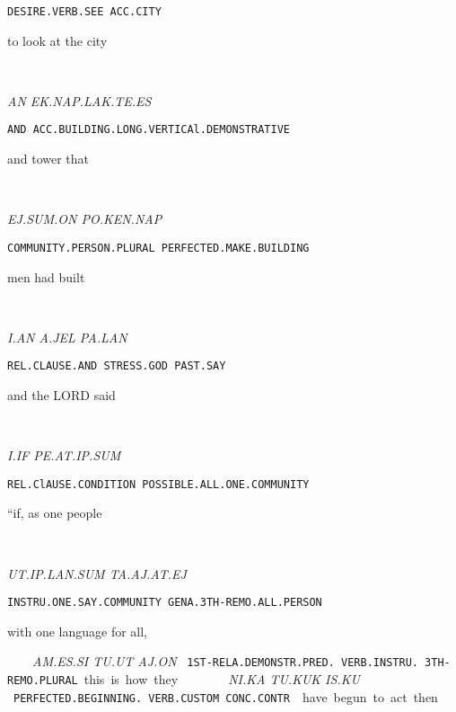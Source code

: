 {{\tt DESIRE.VERB.SEE	ACC.CITY }

to look			at the city 

\drie 
  
\an~\ek\nap\lak\te\es

{\it AN	EK.NAP.LAK.TE.ES			 }

{\tt AND	ACC.BUILDING.LONG.VERTICAl.DEMONSTRATIVE	 }

and 	tower 				that 			 

\drie 

\ej\Atlansum\on ~ \po\ken\nap

{\it EJ.SUM.ON			PO.KEN.NAP }

{\tt COMMUNITY.PERSON.PLURAL	PERFECTED.MAKE.BUILDING }

men				had built 

  
\drie 

\Atlani\an ~ \Atlana\jel~\pa\lan

{\it I.AN			A.JEL		PA.LAN }

{\tt REL.CLAUSE.AND              STRESS.GOD	PAST.SAY }

and 			the LORD            said 

\drie 

\Atlani\Atlanif~\pe\at\ip\Atlansum

{\it I.IF			PE.AT.IP.SUM				 }

{\tt REL.ClAUSE.CONDITION	POSSIBLE.ALL.ONE.COMMUNITY		 }

“if, 			as one people 		
\drie 


\ut\ip\lan\Atlansum~\ta\aj\at\ej\comma

{\it UT.IP.LAN.SUM			TA.AJ.AT.EJ }

{\tt INSTRU.ONE.SAY.COMMUNITY	GENA.3TH-REMO.ALL.PERSON	 }

with one language 		for all, 
\drie 

\am\es\si~\tu\ut~\aj\on
 
{\it AM.ES.SI			TU.UT		AJ.ON }

{\tt 1ST-RELA.DEMONSTR.PRED.	VERB.INSTRU.    3TH-REMO.PLURAL}

this is 				how       	they  
  
\drie 

\Atlanni\ka~\tu\kuk~\is\ku

{\it NI.KA				TU.KUK		IS.KU                    } 

{\tt PERFECTED.BEGINNING.                 VERB.CUSTOM	CONC.CONTR	 }

have begun 			to act		then 		 
\drie 


}
